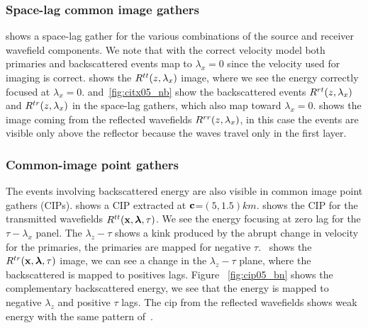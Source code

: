 \subsubsection{Space-lag common image gathers}

 shows a space-lag gather for the various combinations of the source and receiver wavefield components. 
We note that with the correct velocity model both primaries and backscattered events map to $\lambda_x=0$ since the velocity used for 
imaging is correct. 
%
 shows the $R^{tt}(z,\lambda_x)$ image, where we see the energy correctly focused at $\lambda_x=0$. 
 and~\ref{fig:citx05_nb} show the backscattered events $R^{rt}(z,\lambda_x)$ and $R^{tr}(z,\lambda_x)$ in the space-lag gathers, 
which also map toward $\lambda_x=0$.
%
 shows the image coming from the reflected wavefields $R^{rr}(z,\lambda_x)$, in this case the events are
visible only above the reflector because the waves travel only in the first layer.

\subsubsection{Common-image point gathers}

The events involving backscattered energy are also visible in common image point gathers (CIPs).
%
 shows a CIP extracted at ${\bf c}$=$(5,1.5)km$.
 shows the CIP for the transmitted wavefields $R^{tt}({\bf x},{\boldsymbol{\lambda}},\tau)$. We see the energy focusing at zero lag 
for the $\tau-\lambda_x$ panel. The $\lambda_z-\tau$ shows a kink produced by the abrupt change in velocity for the primaries, the primaries
are mapped for negative $\tau$.~
 shows the $R^{tr}({\bf x},{\boldsymbol{\lambda}},\tau)$ image, we can see a change in the $\lambda_z-\tau$ plane, where the backscattered is mapped to positives lags. Figure
~\ref{fig:cip05_bn} shows the complementary backscattered energy, we see that the energy is mapped to negative $\lambda_z$ and positive $\tau$ lags.
The cip from the reflected wavefields shows weak energy with the same pattern of~.




